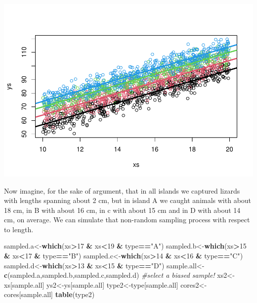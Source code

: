 \documentclass[
]{book}
\newenvironment{Shaded}{\begin{snugshade}}{\end{snugshade}}
\newcommand{\CommentTok}[1]{\textcolor[rgb]{0.56,0.35,0.01}{\textit{#1}}}
\newcommand{\DecValTok}[1]{\textcolor[rgb]{0.00,0.00,0.81}{#1}}
\newcommand{\FunctionTok}[1]{\textcolor[rgb]{0.13,0.29,0.53}{\textbf{#1}}}
\newcommand{\NormalTok}[1]{#1}
\newcommand{\OtherTok}[1]{\textcolor[rgb]{0.56,0.35,0.01}{#1}}
\newcommand{\SpecialCharTok}[1]{\textcolor[rgb]{0.81,0.36,0.00}{\textbf{#1}}}
\newcommand{\StringTok}[1]{\textcolor[rgb]{0.31,0.60,0.02}{#1}}
\begin{document}
\includegraphics{ECOMODbook_files/figure-latex/a10.9-1.pdf}

Now imagine, for the sake of argument, that in all islands we captured lizards with lengths spanning about 2 cm, but in island A we caught animals with about 18 cm, in B with about 16 cm, in c with about 15 cm and in D with about 14 cm, on average. We can simulate that non-random sampling process with respect to length.

\begin{Shaded}
\begin{Highlighting}[]
\NormalTok{sampled.a}\OtherTok{\textless{}{-}}\FunctionTok{which}\NormalTok{(xs}\SpecialCharTok{\textgreater{}}\DecValTok{17} \SpecialCharTok{\&}\NormalTok{ xs}\SpecialCharTok{\textless{}}\DecValTok{19} \SpecialCharTok{\&}\NormalTok{ type}\SpecialCharTok{==}\StringTok{"A"}\NormalTok{)}
\NormalTok{sampled.b}\OtherTok{\textless{}{-}}\FunctionTok{which}\NormalTok{(xs}\SpecialCharTok{\textgreater{}}\DecValTok{15} \SpecialCharTok{\&}\NormalTok{ xs}\SpecialCharTok{\textless{}}\DecValTok{17} \SpecialCharTok{\&}\NormalTok{ type}\SpecialCharTok{==}\StringTok{"B"}\NormalTok{)}
\NormalTok{sampled.c}\OtherTok{\textless{}{-}}\FunctionTok{which}\NormalTok{(xs}\SpecialCharTok{\textgreater{}}\DecValTok{14} \SpecialCharTok{\&}\NormalTok{ xs}\SpecialCharTok{\textless{}}\DecValTok{16} \SpecialCharTok{\&}\NormalTok{ type}\SpecialCharTok{==}\StringTok{"C"}\NormalTok{)}
\NormalTok{sampled.d}\OtherTok{\textless{}{-}}\FunctionTok{which}\NormalTok{(xs}\SpecialCharTok{\textgreater{}}\DecValTok{13} \SpecialCharTok{\&}\NormalTok{ xs}\SpecialCharTok{\textless{}}\DecValTok{15} \SpecialCharTok{\&}\NormalTok{ type}\SpecialCharTok{==}\StringTok{"D"}\NormalTok{)}
\NormalTok{sample.all}\OtherTok{\textless{}{-}}\FunctionTok{c}\NormalTok{(sampled.a,sampled.b,sampled.c,sampled.d)}
\CommentTok{\#select a biased sample!}
\NormalTok{xs2}\OtherTok{\textless{}{-}}\NormalTok{xs[sample.all]}
\NormalTok{ys2}\OtherTok{\textless{}{-}}\NormalTok{ys[sample.all]}
\NormalTok{type2}\OtherTok{\textless{}{-}}\NormalTok{type[sample.all]}
\NormalTok{cores2}\OtherTok{\textless{}{-}}\NormalTok{cores[sample.all]}
\FunctionTok{table}\NormalTok{(type2)}
\end{Highlighting}
\end{Shaded}
\end{document}
